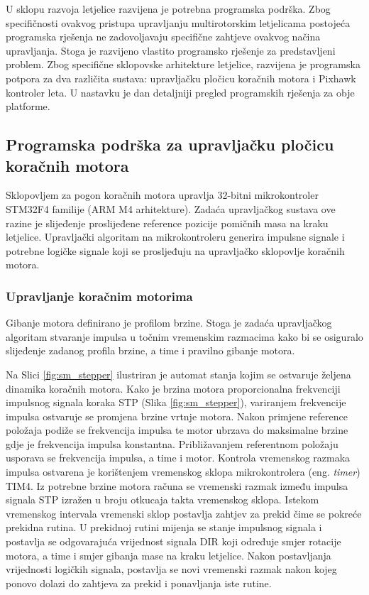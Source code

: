 \documentclass[11pt,a4paper]{article}
\begin{document}
	
U sklopu razvoja letjelice razvijena je potrebna programska podrška. Zbog specifičnosti ovakvog pristupa upravljanju multirotorskim letjelicama postojeća programska rješenja ne zadovoljavaju specifične zahtjeve ovakvog načina upravljanja. Stoga je razvijeno vlastito programsko rješenje za predstavljeni problem. Zbog specifične sklopovske arhitekture letjelice, razvijena je programska potpora za dva različita sustava: upravljačku pločicu koračnih motora i Pixhawk kontroler leta. U nastavku je dan detaljniji pregled programskih rješenja za  obje platforme. 


\subsection{Programska podrška za upravljačku pločicu koračnih motora}

Sklopovljem za pogon koračnih motora upravlja 32-bitni mikrokontroler STM32F4 familije (ARM M4 arhitekture). Zadaća upravljačkog sustava ove razine je
slijeđenje proslijeđene reference pozicije pomičnih masa na kraku letjelice. Upravljački algoritam na mikrokontroleru generira impulsne signale i potrebne logičke signale koji se prosljeđuju na upravljačko sklopovlje koračnih motora. \newline

\subsubsection{Upravljanje koračnim motorima}
Gibanje motora definirano je profilom brzine. Stoga je zadaća upravljačkog algoritam stvaranje impulsa u točnim vremenskim razmacima kako bi se osiguralo slijeđenje zadanog profila brzine, a time i pravilno gibanje motora.

Na Slici \ref{fig:sm_stepper} ilustriran je automat stanja kojim se ostvaruje željena dinamika koračnih motora. Kako je brzina motora proporcionalna 
frekvenciji impulsnog signala koraka STP (Slika \ref{fig:sm_stepper}), variranjem frekvencije impulsa ostvaruje se promjena brzine vrtnje motora. Nakon primjene reference položaja podiže se frekvencija impulsa te motor ubrzava do maksimalne brzine gdje je frekvencija impulsa konstantna. Približavanjem referentnom položaju usporava se frekvencija impulsa, a time i motor. \newline
Kontrola vremenskog razmaka impulsa ostvarena je korištenjem vremenskog sklopa mikrokontrolera (eng. \textit{timer}) TIM4. Iz potrebne brzine motora računa se vremenski razmak između impulsa signala STP izražen u broju otkucaja takta vremenskog sklopa. Istekom vremenskog intervala vremenski sklop postavlja zahtjev za prekid čime se pokreće prekidna rutina. U prekidnoj rutini mijenja se stanje impulsnog signala i postavlja se odgovarajuća vrijednost signala DIR koji određuje smjer rotacije motora, a time i smjer gibanja mase na kraku letjelice. Nakon postavljanja vrijednosti logičkih signala, postavlja se novi vremenski razmak nakon kojeg ponovo dolazi do zahtjeva za prekid i ponavljanja iste rutine.
\end{document}
